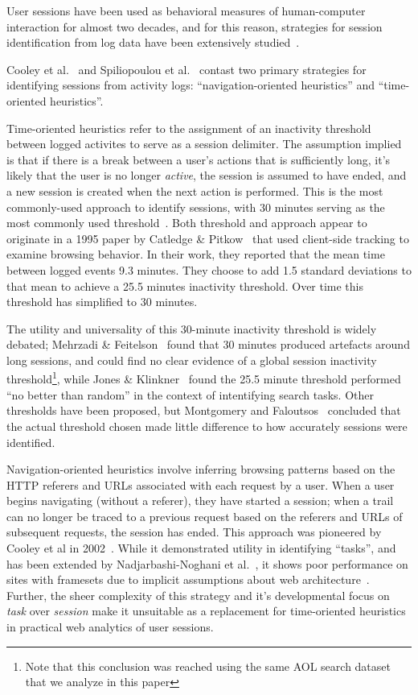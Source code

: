 User sessions have been used as behavioral measures of human-computer interaction for almost two decades, and for this reason, strategies for session identification from log data have been extensively studied~\cite{eickhoff2014lessons}.

Cooley et al.~\cite{cooley1999data} and Spiliopoulou et al.~\cite{spiliopoulou2003framework} contast two primary strategies for identifying sessions from activity logs: ``navigation-oriented heuristics'' and ``time-oriented heuristics''.

Time-oriented heuristics refer to the assignment of an inactivity threshold between logged activites to serve as a session delimiter.  The assumption implied is that if there is a break between a user's actions that is sufficiently long, it's likely that the user is no longer \emph{active}, the session is assumed to have ended, and a new session is created when the next action is performed. This is the most commonly-used approach to identify sessions, with 30 minutes serving as the most commonly used threshold~\cite{eickhoff2014lessons,spiliopoulou2003framework,ortega2010differences}.  Both threshold and approach appear to originate in a 1995 paper by Catledge \& Pitkow~\cite{catledge1995characterizing} that used client-side tracking to examine browsing behavior. In their work, they reported that the mean time between logged events 9.3 minutes.  They choose to add 1.5 standard deviations to that mean to achieve a 25.5 minutes inactivity threshold.  Over time this threshold has simplified to 30 minutes.

The utility and universality of this 30-minute inactivity threshold is widely debated; Mehrzadi \& Feitelson~\cite{mehrzadi2012onextracting} found that 30 minutes produced artefacts around long sessions, and could find no clear evidence of a global session inactivity threshold\footnote{Note that this conclusion was reached using the same AOL search dataset that we analyze in this paper}, while Jones \& Klinkner~\cite{jones2008beyond} found the 25.5 minute threshold performed ``no better than random'' in the context of intentifying search tasks. Other thresholds have been proposed, but Montgomery and Faloutsos~\cite{montgomery2001identifying} concluded that the actual threshold chosen made little difference to how accurately sessions were identified.

Navigation-oriented heuristics involve inferring browsing patterns based on the HTTP referers and URLs associated with each request by a user. When a user begins navigating (without a referer), they have started a session; when a trail can no longer be traced to a previous request based on the referers and URLs of subsequent requests, the session has ended.  This approach was pioneered by Cooley et al in 2002~\cite{cooley1999data}.  While it demonstrated utility in identifying ``tasks'', and has been extended by Nadjarbashi-Noghani et al.~\cite{nadjarbashi2004improving}, it shows poor performance on sites with framesets due to implicit assumptions about web architecture~\cite{berendt2003impact}. Further, the sheer complexity of this strategy and it's developmental focus on \emph{task} over \emph{session} make it unsuitable as a replacement for time-oriented heuristics in practical web analytics of user sessions.


